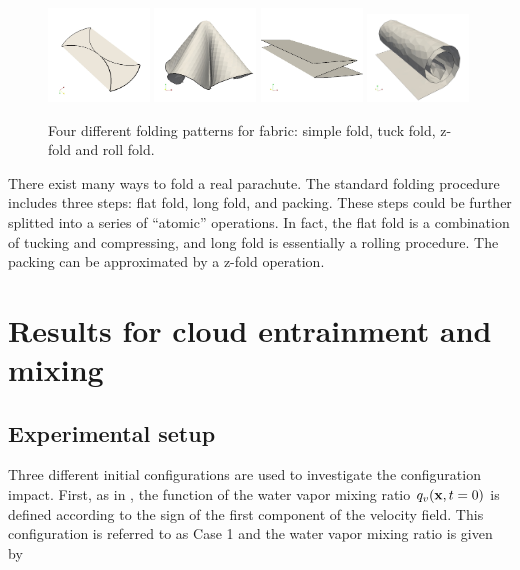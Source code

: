 \begin{figure}[!htbp]
\includegraphics[width=0.24\textwidth]{Figures/simple_fold.jpg}
\includegraphics[width=0.24\textwidth]{Figures/tuck_fold.jpg}
\includegraphics[width=0.24\textwidth]{Figures/z_fold.jpg}
\includegraphics[width=0.24\textwidth]{Figures/roll_fold.jpg}
\caption{Four different folding patterns for fabric: simple fold, tuck fold, z-fold and roll fold.}
\label{simple_fold}
\end{figure}

There exist many ways to fold a real parachute. The standard folding procedure includes three steps: flat fold, long fold, and packing. These steps could be further splitted into a series of ``atomic'' operations. In fact, the flat fold is a combination of tucking and compressing, and long fold is essentially a rolling procedure. The packing can be approximated by a z-fold operation.

\section{Results for cloud entrainment and mixing}
\subsection{Experimental setup}
Three different initial configurations are used to investigate
the configuration impact. First, as in \cite{Andrejczuk2004}, the function of the water vapor mixing 
ratio $q_v(\mathbf{x}, t = 0)$ is defined according to the sign of the first component of the velocity 
field. This configuration is referred to as Case 1 and the water vapor mixing ratio is
given by

